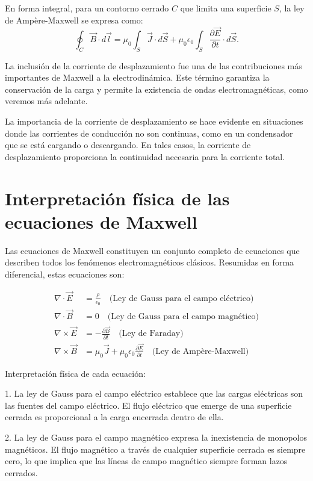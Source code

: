 \documentclass[12pt,a4paper]{book}
\begin{document}
En forma integral, para un contorno cerrado $C$ que limita una superficie $S$, la ley de Ampère-Maxwell se expresa como:
\begin{equation}
\oint_C \vec{B} \cdot d\vec{l} = \mu_0 \int_S \vec{J} \cdot d\vec{S} + \mu_0 \epsilon_0 \int_S \frac{\partial \vec{E}}{\partial t} \cdot d\vec{S}.
\end{equation}

La inclusión de la corriente de desplazamiento fue una de las contribuciones más importantes de Maxwell a la electrodinámica. Este término garantiza la conservación de la carga y permite la existencia de ondas electromagnéticas, como veremos más adelante.

La importancia de la corriente de desplazamiento se hace evidente en situaciones donde las corrientes de conducción no son continuas, como en un condensador que se está cargando o descargando. En tales casos, la corriente de desplazamiento proporciona la continuidad necesaria para la corriente total.

\section{Interpretación física de las ecuaciones de Maxwell}

Las ecuaciones de Maxwell constituyen un conjunto completo de ecuaciones que describen todos los fenómenos electromagnéticos clásicos. Resumidas en forma diferencial, estas ecuaciones son:

\begin{align}
\nabla \cdot \vec{E} &= \frac{\rho}{\epsilon_0} \quad \text{(Ley de Gauss para el campo eléctrico)} \\
\nabla \cdot \vec{B} &= 0 \quad \text{(Ley de Gauss para el campo magnético)} \\
\nabla \times \vec{E} &= -\frac{\partial \vec{B}}{\partial t} \quad \text{(Ley de Faraday)} \\
\nabla \times \vec{B} &= \mu_0 \vec{J} + \mu_0 \epsilon_0 \frac{\partial \vec{E}}{\partial t} \quad \text{(Ley de Ampère-Maxwell)}
\end{align}

Interpretación física de cada ecuación:

1. La ley de Gauss para el campo eléctrico establece que las cargas eléctricas son las fuentes del campo eléctrico. El flujo eléctrico que emerge de una superficie cerrada es proporcional a la carga encerrada dentro de ella.

2. La ley de Gauss para el campo magnético expresa la inexistencia de monopolos magnéticos. El flujo magnético a través de cualquier superficie cerrada es siempre cero, lo que implica que las líneas de campo magnético siempre forman lazos cerrados.
\end{document}
